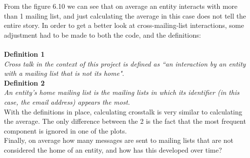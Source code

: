 \documentclass[a4paper,english]{report}
\begin{document}
From the figure 6.10 we can see that on average an entity interacts with more than 1 mailing list, and just calculating the average in this case does not tell the entire story. In order to get a better look at cross-mailing-list interactions, some adjustment had to be made to both the code, and the definitions:\\\\
\indent
\textbf{Definition 1}\\
 
\textit{Cross talk in the context of this project is defined as “an interaction by an entity with a mailing list that is not its home"}.\\

\textbf{Definition 2}\\

\textit{An entity's home mailing list is the mailing lists in which its identifier (in this case, the email address) appears the most.}\\

With the definitions in place, calculating crosstalk is very similar to calculating the average. The only difference between the 2 is the fact that the most frequent component is ignored in one of the plots.\\


Finally, on average how many messages are sent to mailing lists that are not considered the home of an entity, and how has this developed over time?\\\\
\end{document}
